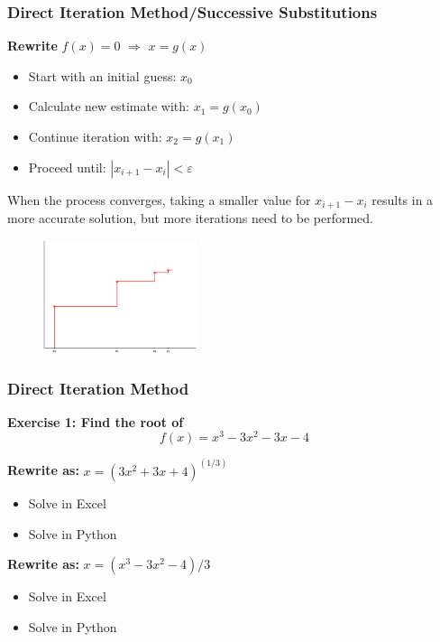   \begin{frame}[fragile]
    \frametitle{Direct Iteration Method/Successive Substitutions}
  
    \textbf{Rewrite} \( f(x) = 0 \) \(\Rightarrow\) \( x = g(x) \)
    \begin{itemize}
      \item Start with an initial guess: \( x_0 \)
      \item Calculate new estimate with: \( x_1 = g(x_0) \)
      \item Continue iteration with: \( x_2 = g(x_1) \)
      \item Proceed until: \( |x_{i+1} - x_i| <  \varepsilon \)
    \end{itemize}
  
    When the process converges, taking a smaller value for \( x_{i+1} - x_i \) results in a more accurate solution, but more iterations need to be performed.
  
    \begin{figure}
    \includegraphics[width=0.4\textwidth]{direct_iteration_photo.eps}
    \end{figure}
  \end{frame}


  \begin{frame}[fragile]
    \frametitle{Direct Iteration Method}
    
    \textbf{Exercise 1: Find the root of}
    \[
    f(x) = x^3 -3x^2 - 3x - 4
    \]
    
    \textbf{Rewrite as:}
    \(
    x = (3x^2 + 3x + 4)^{(1/3)}
    \)
    \begin{itemize}
      \item Solve in Excel
      \item Solve in Python
    \end{itemize}
  
    \textbf{Rewrite as:}
    \(
    x = (x^3 - 3x^2 - 4)/3
    \)
    \begin{itemize}
      \item Solve in Excel
      \item Solve in Python
    \end{itemize}
  \end{frame}
  
